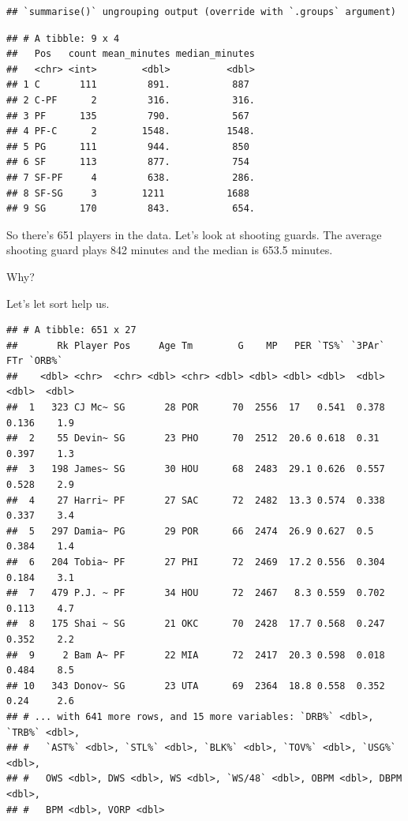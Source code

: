 \documentclass[
]{book}
\newenvironment{Shaded}{\begin{snugshade}}{\end{snugshade}}
\newcommand{\KeywordTok}[1]{\textcolor[rgb]{0.13,0.29,0.53}{\textbf{#1}}}
\newcommand{\NormalTok}[1]{#1}
\newcommand{\OperatorTok}[1]{\textcolor[rgb]{0.81,0.36,0.00}{\textbf{#1}}}
\newcommand{\StringTok}[1]{\textcolor[rgb]{0.31,0.60,0.02}{#1}}
\begin{document}
\begin{verbatim}
## `summarise()` ungrouping output (override with `.groups` argument)
\end{verbatim}

\begin{verbatim}
## # A tibble: 9 x 4
##   Pos   count mean_minutes median_minutes
##   <chr> <int>        <dbl>          <dbl>
## 1 C       111         891.           887 
## 2 C-PF      2         316.           316.
## 3 PF      135         790.           567 
## 4 PF-C      2        1548.          1548.
## 5 PG      111         944.           850 
## 6 SF      113         877.           754 
## 7 SF-PF     4         638.           286.
## 8 SF-SG     3        1211           1688 
## 9 SG      170         843.           654.
\end{verbatim}

So there's 651 players in the data. Let's look at shooting guards. The average shooting guard plays 842 minutes and the median is 653.5 minutes.

Why?

Let's let sort help us.

\begin{Shaded}
\end{Shaded}

\begin{verbatim}
## # A tibble: 651 x 27
##       Rk Player Pos     Age Tm        G    MP   PER `TS%` `3PAr`   FTr `ORB%`
##    <dbl> <chr>  <chr> <dbl> <chr> <dbl> <dbl> <dbl> <dbl>  <dbl> <dbl>  <dbl>
##  1   323 CJ Mc~ SG       28 POR      70  2556  17   0.541  0.378 0.136    1.9
##  2    55 Devin~ SG       23 PHO      70  2512  20.6 0.618  0.31  0.397    1.3
##  3   198 James~ SG       30 HOU      68  2483  29.1 0.626  0.557 0.528    2.9
##  4    27 Harri~ PF       27 SAC      72  2482  13.3 0.574  0.338 0.337    3.4
##  5   297 Damia~ PG       29 POR      66  2474  26.9 0.627  0.5   0.384    1.4
##  6   204 Tobia~ PF       27 PHI      72  2469  17.2 0.556  0.304 0.184    3.1
##  7   479 P.J. ~ PF       34 HOU      72  2467   8.3 0.559  0.702 0.113    4.7
##  8   175 Shai ~ SG       21 OKC      70  2428  17.7 0.568  0.247 0.352    2.2
##  9     2 Bam A~ PF       22 MIA      72  2417  20.3 0.598  0.018 0.484    8.5
## 10   343 Donov~ SG       23 UTA      69  2364  18.8 0.558  0.352 0.24     2.6
## # ... with 641 more rows, and 15 more variables: `DRB%` <dbl>, `TRB%` <dbl>,
## #   `AST%` <dbl>, `STL%` <dbl>, `BLK%` <dbl>, `TOV%` <dbl>, `USG%` <dbl>,
## #   OWS <dbl>, DWS <dbl>, WS <dbl>, `WS/48` <dbl>, OBPM <dbl>, DBPM <dbl>,
## #   BPM <dbl>, VORP <dbl>
\end{verbatim}
\end{document}
